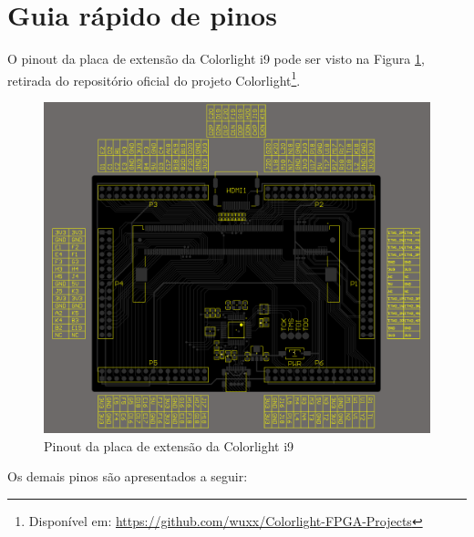 \documentclass{report}
\begin{document}
\section{Guia rápido de pinos}

O pinout da placa de extensão da Colorlight i9 pode ser visto na Figura \ref{fig:i9_v7.2_pinout}, retirada do repositório oficial do projeto Colorlight\footnote{Disponível em: \url{https://github.com/wuxx/Colorlight-FPGA-Projects}}.

\begin{figure}[H]
    \centering
    \includegraphics[width=0.75\linewidth]{i9_v7.2_pinout.png}
    \caption{Pinout da placa de extensão da Colorlight i9}
    \label{fig:i9_v7.2_pinout}
\end{figure}

Os demais pinos são apresentados a seguir:
\end{document}
